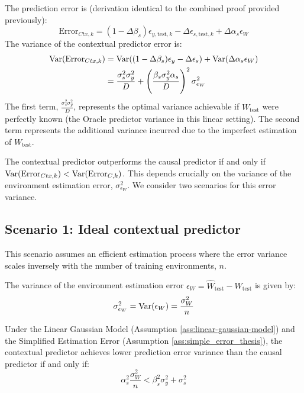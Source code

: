 \documentclass[../thesis.tex]{subfiles}
\begin{document}
The prediction error is (derivation identical to the combined proof provided previously):
\[ \text{Error}_{Ctx,k} = (1 - \Delta \beta_s) \epsilon_{y,\text{test},k} - \Delta \epsilon_{s,\text{test},k} + \Delta \alpha_s \epsilon_W \]
The variance of the contextual predictor error is:
\begin{align}
    \mathrm{Var}(\text{Error}_{Ctx,k}) &= \mathrm{Var}((1 - \Delta \beta_s) \epsilon_{y} - \Delta \epsilon_{s}) + \mathrm{Var}(\Delta \alpha_s \epsilon_W) \nonumber \\
    &= \frac{\sigma_s^2 \sigma_y^2}{D} + \left(\frac{\beta_s \sigma_y^2 \alpha_s}{D}\right)^2 \sigma_{\epsilon_W}^2 \label{eq:contextual_var_general_thesis}
\end{align}
The first term, $\frac{\sigma_s^2 \sigma_y^2}{D}$, represents the optimal variance achievable if $W_{\text{test}}$ were perfectly known (the Oracle predictor variance in this linear setting). The second term represents the additional variance incurred due to the imperfect estimation of $W_{\text{test}}$.

The contextual predictor outperforms the causal predictor if and only if $\mathrm{Var}(\text{Error}_{Ctx,k}) < \mathrm{Var}(\text{Error}_{C,k})$. This depends crucially on the variance of the environment estimation error, $\sigma_{\epsilon_W}^2$. We consider two scenarios for this error variance.

\subsection{Scenario 1: Ideal contextual predictor}

This scenario assumes an efficient estimation process where the error variance scales inversely with the number of training environments, $n$.

\begin{assumption}
\label{ass:simple_error_thesis}
The variance of the environment estimation error $\epsilon_W = \hat{W}_{\text{test}} - W_{\text{test}}$ is given by:
\[ \sigma_{\epsilon_W}^2 = \mathrm{Var}(\epsilon_W) = \frac{\sigma_W^2}{n} \]
\end{assumption}

\begin{theorem}
\label{thm:simple_thesis}
Under the Linear Gaussian Model (Assumption \ref{ass:linear-gaussian-model}) and the Simplified Estimation Error (Assumption \ref{ass:simple_error_thesis}), the contextual predictor achieves lower prediction error variance than the causal predictor if and only if:
\[ \alpha_s^2 \frac{\sigma_W^2}{n} < \beta_s^2 \sigma_y^2 + \sigma_s^2 \]
\end{theorem}
\end{document}
